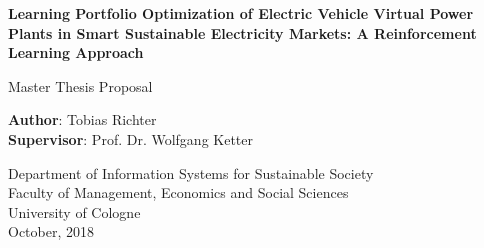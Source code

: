 \begin{titlepage}
    \begin{center}
        \vspace*{1cm}

        \Large
        \textbf{Learning Portfolio Optimization of Electric Vehicle Virtual Power Plants in Smart Sustainable Electricity Markets: A Reinforcement Learning Approach}

        \vspace{1.5cm}
        Master Thesis Proposal

        \vspace{8.0cm}

        \large
        \textbf{Author}: Tobias Richter\\
        \large
        \textbf{Supervisor}: Prof. Dr. Wolfgang Ketter

        \vspace{1cm}
        \large
        Department of Information Systems for Sustainable Society\\
        Faculty of Management, Economics and Social Sciences\\
        University of Cologne\\

        \vspace{1cm}
        October, 2018

    \end{center}
\end{titlepage}
